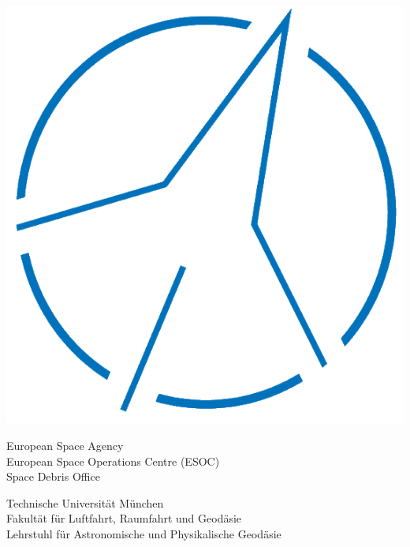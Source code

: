 \begin{minipage}[r]{0.1\textwidth}
\includegraphics[scale=0.13]{./Images/Department_logo.png}
\end{minipage}

\bigskip
\begin{minipage}{0.62\textwidth}
\begin{flushleft}
\normalsize{European Space Agency \\European Space Operations Centre (ESOC) \\Space Debris Office}
\end{flushleft}
\end{minipage}
\begin{minipage}{0.37\textwidth}
\begin{flushleft}
\normalsize{Technische Universität München \\Fakultät für Luftfahrt, Raumfahrt und Geodäsie \\Lehrstuhl für Astronomische und Physikalische Geodäsie }
\end{flushleft}
\end{minipage}

